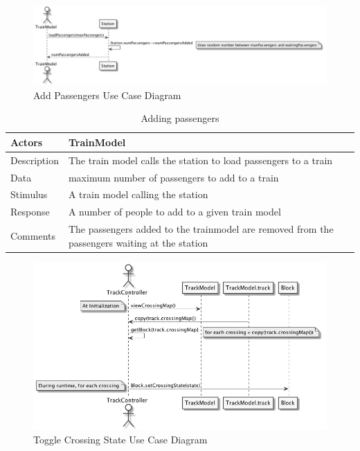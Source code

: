 \documentclass[]{article}
\begin{document}
\begin{figure}[H]
	\centering
	\includegraphics[scale=.5]{addPassengers.png}
	\caption{Add Passengers Use Case Diagram}
\end{figure}
\begin{table}[H]
	\centering
	\caption{Adding passengers}
	\begin{tabular}{|l|l|}
		\hline
		Actors & \parbox[t]{10cm}{TrainModel} \\ \hline
		Description & \parbox[t]{10cm}{The train model calls the station to load passengers to a train} \\ \hline
		Data &  \parbox[t]{10cm}{maximum number of passengers to add to a train} \\ \hline
		Stimulus &  \parbox[t]{10cm}{A train model calling the station} \\ \hline
		Response & \parbox[t]{10cm}{A number of people to add to a given train model}\\ \hline
		Comments & \parbox[t]{10cm}{The passengers added to the trainmodel are removed from the passengers waiting at the station}  \\ \hline
	\end{tabular}
\end{table}

\begin{figure}[H]
	\centering
	\includegraphics[scale=.5]{crossing.png}
	\caption{Toggle Crossing State Use Case Diagram}
\end{figure}
\end{document}
